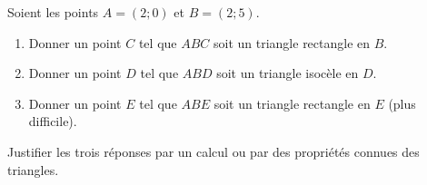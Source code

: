 
\begin{exercice}\label{exosmath-0125}

    Soient les points \( A=(2;0)\) et \( B=(2;5)\).
    \begin{enumerate}
        \item
            Donner un point \( C\) tel que \( ABC\) soit un triangle rectangle en \( B\).
        \item
            Donner un point \( D\) tel que \( ABD\) soit un triangle isocèle en \( D\).
        \item
            Donner un point \( E\) tel que \( ABE\) soit un triangle rectangle en \( E\) (plus difficile).
    \end{enumerate}
    Justifier les trois réponses par un calcul ou par des propriétés connues des triangles.

\end{exercice}
